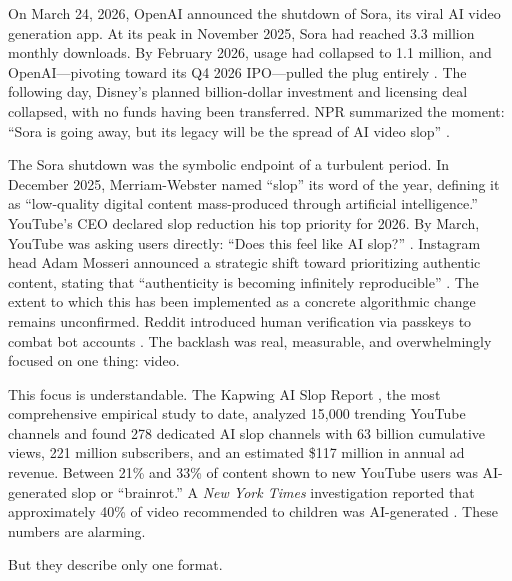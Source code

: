 \documentclass[12pt,a4paper]{article}
\begin{document}
On March 24, 2026, OpenAI announced the shutdown of Sora, its viral AI video generation app. At its peak in November 2025, Sora had reached 3.3 million monthly downloads. By February 2026, usage had collapsed to 1.1 million, and OpenAI---pivoting toward its Q4 2026 IPO---pulled the plug entirely \parencite{NPR2026a}. The following day, Disney's planned billion-dollar investment and licensing deal collapsed, with no funds having been transferred. NPR summarized the moment: ``Sora is going away, but its legacy will be the spread of AI video slop'' \parencite{NPR2026b}.

The Sora shutdown was the symbolic endpoint of a turbulent period. In December 2025, Merriam-Webster named ``slop'' its word of the year, defining it as ``low-quality digital content mass-produced through artificial intelligence.'' YouTube's CEO declared slop reduction his top priority for 2026. By March, YouTube was asking users directly: ``Does this feel like AI slop?'' \parencite{Dexerto2026}. Instagram head Adam Mosseri announced a strategic shift toward prioritizing authentic content, stating that ``authenticity is becoming infinitely reproducible'' \parencite{Mosseri2025}. The extent to which this has been implemented as a concrete algorithmic change remains unconfirmed. Reddit introduced human verification via passkeys to combat bot accounts \parencite{WinBuzzer2026}. The backlash was real, measurable, and overwhelmingly focused on one thing: video.

This focus is understandable. The Kapwing AI Slop Report \parencite{Kapwing2025}, the most comprehensive empirical study to date, analyzed 15,000 trending YouTube channels and found 278 dedicated AI slop channels with 63 billion cumulative views, 221 million subscribers, and an estimated \$117 million in annual ad revenue. Between 21\% and 33\% of content shown to new YouTube users was AI-generated slop or ``brainrot.'' A \textit{New York Times} investigation reported that approximately 40\% of video recommended to children was AI-generated \parencite{NYT2026}. These numbers are alarming.

But they describe only one format.
\end{document}
